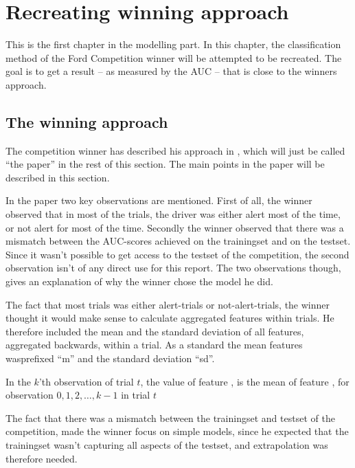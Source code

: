 \chapter{Recreating winning approach}\label{sec:recreating}
This is the first chapter in the modelling part. In this chapter, the classification method of the Ford Competition winner will be attempted to be recreated. The goal is to get a result -- as measured by the AUC -- that is close to the winners approach.

\section{The winning approach}
The competition winner has described his approach in \citet{inference_winning_approach}, which will just be called ``the paper'' in the rest of this section. The main points in the paper will be described in this section. \par
In the paper two key observations are mentioned. First of all, the winner observed that in most of the trials, the driver was either alert most of the time, or not alert for most of the time. Secondly the winner observed that there was a mismatch between the AUC-scores achieved on the trainingset and on the testset. Since it wasn't possible to get access to the testset of the competition, the second observation isn't of any direct use for this report. The two observations though, gives an explanation of why the winner chose the model he did. \par
The fact that most trials was either alert-trials or not-alert-trials, the winner thought it would make sense to calculate aggregated features within trials. He therefore included the mean and the standard deviation of all features, aggregated backwards, within a trial. As a standard the mean features wasprefixed ``m'' and the standard deviation ``sd''. 
\begin{Exa}
    In the $k$'th observation of trial $t$, the value of feature , is the mean of feature , for observation $0,1,2,\dots,k-1$ in trial $t$
\end{Exa}
The fact that there was a mismatch between the trainingset and testset of the competition, made the winner focus on simple models, since he expected that the trainingset wasn't capturing all aspects of the testset, and extrapolation was therefore needed.


